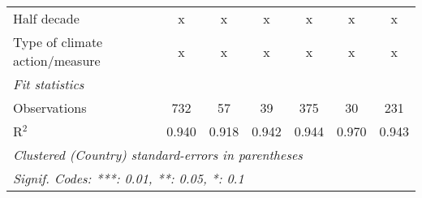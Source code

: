\begin{table}[htbp]
\begin{tabular}{lcccccc}
      Half decade                                                      & x             & x                         & x              & x               & x               & x\\  
      Type of climate action/measure                                   & x             & x                         & x              & x               & x               & x\\  
      \midrule \emph{Fit statistics}\\
      Observations                                                     & 732           & 57                        & 39             & 375             & 30              & 231\\  
      R$^2$                                                            & 0.940         & 0.918                     & 0.942          & 0.944           & 0.970           & 0.943\\  
      \midrule
      \multicolumn{7}{l}{\emph{Clustered (Country) standard-errors in parentheses}}\\
      \multicolumn{7}{l}{\emph{Signif. Codes: ***: 0.01, **: 0.05, *: 0.1}}\\
   \end{tabular}
\end{table}



